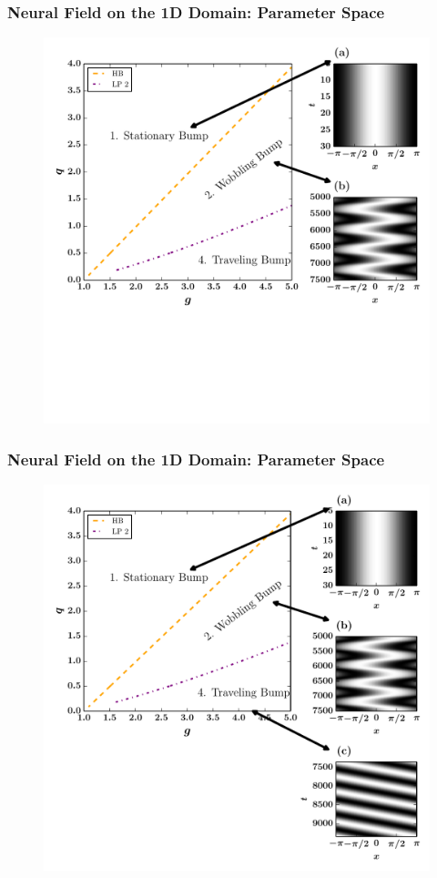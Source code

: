 \documentclass{beamer}
\begin{document}
\begin{frame}
\frametitle{Neural Field on the 1D Domain: Parameter Space}
\begin{figure}
 \includegraphics[width=.6\textwidth]{oned_full_2par2.pdf}
\end{figure}
\end{frame}


\begin{frame}
\frametitle{Neural Field on the 1D Domain: Parameter Space}
\begin{figure}
 \includegraphics[width=.6\textwidth]{oned_full_2par3.pdf}
\end{figure}
\end{frame}
\end{document}
